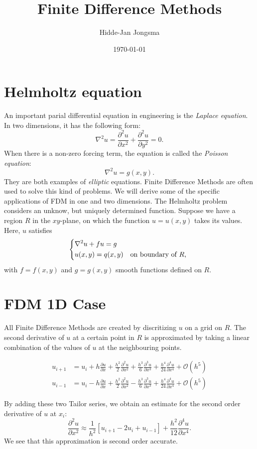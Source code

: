 \documentclass[a4paper]{article}
\author{Hidde-Jan Jongsma}
\title{Finite Difference Methods}
\date{\today}
\newcommand{\dux}{\frac{\partial u}{\partial x}}
\newcommand{\duxx}{\frac{\partial^2 u}{\partial x^2}}
\newcommand{\duxxx}{\frac{\partial^3 u}{\partial x^3}}
\newcommand{\duyy}{\frac{\partial^2 u}{\partial y^2}}
\newcommand{\lapu}{\nabla^2 u}
\begin{document}
\section{Helmholtz equation}

An important parial differential equation in engineering is the
\emph{Laplace equation}. In two dimensions, it has the following form:
\begin{equation}
  \lapu = \duxx + \duyy = 0.
\end{equation}
When there is a non-zero forcing term, the equation is called the
\emph{Poisson equation}:
\begin{equation}
  \lapu = g(x, y).
\end{equation}
They are both examples of \emph{elliptic} equations. Finite Difference
Methods are often used to solve this kind of problems. We will derive
some of the specific applications of FDM in one and two dimensions.
The Helmholtz problem considers an unknow, but uniquely determined function.
Suppose we have a region $R$ in the $xy$-plane, on which the function
$u = u(x, y)$ takes its values. Here, $u$ satisfies
\begin{equation}
  \begin{dcases*}
    \lapu + f u = g & \\
    u(x, y) = q(x, y) & on boundary of $R$,
  \end{dcases*}
\end{equation}
with $f = f(x, y)$ and $g = g(x, y)$ smooth functions defined on $R$.

\section{FDM 1D Case}

All Finite Difference Methods are created by discritizing $u$ on a grid
on $R$. The second derivative of $u$ at a certain point in $R$  is
approximated by taking a linear combination of the values of $u$ at
the neighbouring points.

\begin{align}
  u_{i + 1} & = u_i + h \dux + \frac{h^2}{2} \duxx + \frac{h^3}{6} \duxxx
                + \frac{h^4}{24} \frac{\partial^4 u}{\partial x^4} + \mathcal{O}(h^5) \\
%
  u_{i - 1} & = u_i - h \dux + \frac{h^2}{2} \duxx - \frac{h^3}{6} \duxxx
                + \frac{h^4}{24} \frac{\partial^4 u}{\partial x^4} + \mathcal{O}(h^5)
\end{align}

By adding these two Tailor series, we obtain an estimate for the second order derivative of
$u$ at $x_i$:
\begin{equation}
  \duxx \approx \frac{1}{h^2}[ u_{i + 1} - 2 u_i + u_{i - 1} ]
          + \frac{h^2}{12} \frac{\partial^4 u}{\partial x^4}.
\end{equation}
We see that this approximation is second order accurate.
\end{document}

